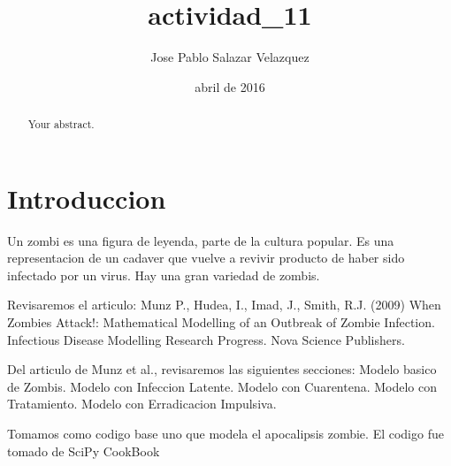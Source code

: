 \documentclass[a4paper]{article}
\title{actividad_11}
\author{Jose Pablo Salazar Velazquez}
\date{abril de 2016}
\begin{document}
\begin{abstract}
Your abstract.
\end{abstract}

\section{Introduccion}

Un zombi es una figura de leyenda, parte de la cultura popular. Es una representacion de un cadaver que vuelve a revivir producto de haber sido infectado por un virus. Hay una gran variedad de zombis.
 
Revisaremos el articulo: Munz P., Hudea, I., Imad, J., Smith, R.J. (2009) When Zombies Attack!: Mathematical Modelling of an Outbreak of Zombie Infection. Infectious Disease Modelling Research Progress. Nova Science Publishers.
 
Del articulo de Munz et al., revisaremos las siguientes secciones:
Modelo basico de Zombis.
Modelo con Infeccion Latente.
Modelo con Cuarentena.
Modelo con Tratamiento.
Modelo con Erradicacion Impulsiva.

Tomamos como codigo base uno que modela el apocalipsis zombie. El codigo fue tomado de SciPy CookBook
\end{document}
